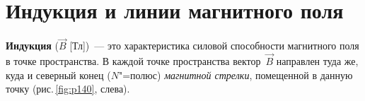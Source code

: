 \documentclass[main.tex]{subfiles}
\begin{document}

 

 

\setcounter{section}{29
}
\addtocounter{section}{-1} 

\section{Индукция и линии магнитного поля}


\textbf{Индукция} ($\vec B$ [Тл])~--- это характеристика силовой способности магнитного поля в точке пространства. В каждой точке пространства вектор~$\vec B$ направлен туда же, куда и северный конец ($N$"=полюс) \emph{магнитной стрелки}, помещенной в данную точку (рис.\,\ref{fig:p140}, слева). 
\end{document}
